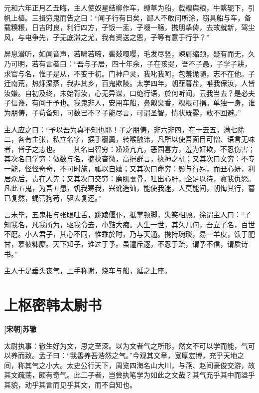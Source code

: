 \documentclass[UTF8,titlepage,oneside]{ctexbook}
\begin{document}
元和六年正月乙丑晦，主人使奴星结柳作车，缚草为船，载糗舆粮，牛繫轭下，引帆上樯。三揖穷鬼而告之曰：“闻子行有日矣，鄙人不敢问所涂，窃具船与车，备载糗粻，日吉时良，利行四方，子饭一盂，子啜一觞，携朋挚俦，去故就新，驾尘风，与电争先，子无底滞之尤，我有资送之恩，子等有意于行乎？”

屏息潜听，如闻音声，若啸若啼，砉敥嘎嘤，毛发尽竖，竦肩缩颈，疑有而无，久乃可明，若有言者曰：“吾与子居，四十年余，子在孩提，吾不子愚，子学子耕，求官与名，惟子是从，不变于初。门神户灵，我叱我呵，包羞诡随，志不在他。子迁南荒，热烁湿蒸，我非其乡，百鬼欺陵。太学四年，朝韮暮盐，唯我保汝，人皆汝嫌。自初及终，未始背汝，心无异谋，口绝行语，於何听闻，云我当去？是必夫子信谗，有间于予也。我鬼非人，安用车船，鼻齅臭香，糗粻可捐。单独一身，谁为朋俦，子苟备知，可数已不？子能尽言，可谓圣智，情状既露，敢不回避。”

主人应之曰：“予以吾为真不知也耶！子之朋俦，非六非四，在十去五，满七除二，各有主张，私立名字，捩手覆羹，转喉触讳，凡所以使吾面目可憎、语言无味者，皆子之志也。——其名曰智穷：矫矫亢亢，恶园喜方，羞为奸欺，不忍伤害；其次名曰学穷：傲数与名，摘抉杳微，高挹群言，执神之机；又其次曰文穷：不专一能，怪怪奇奇，不可时施，祗以自嬉；又其次曰命穷：影与行殊，而丑心妍，利居众后，责在人先；又其次曰交穷：磨肌戛骨，吐出心肝，企足以待，寘我仇怨。凡此五鬼，为吾五患，饥我寒我，兴讹造讪，能使我迷，人莫能间，朝悔其行，暮已复然，蝇营狗苟，驱去复还。”

言未毕，五鬼相与张眼吐舌，跳踉偃仆，抵掌顿脚，失笑相顾。徐谓主人曰：“子知我名，凡我所为，驱我令去，小黠大痴。人生一世，其久几何，吾立子名，百世不磨。小人君子，其心不同，惟乖於时，乃与天通。携持琬琰，易一羊皮，饫于肥甘，慕彼糠糜。天下知子，谁过于予。虽遭斥逐，不忍于疏，谓予不信，请质诗书。”

主人于是垂头丧气，上手称谢，烧车与船，延之上座。 


\chapter*{上枢密韩太尉书}
\begin{center}
	\textbf{[宋朝]苏辙}
\end{center}

太尉执事：辙生好为文，思之至深。以为文者气之所形，然文不可以学而能，气可以养而致。孟子曰：“我善养吾浩然之气。”今观其文章，宽厚宏博，充乎天地之间，称其气之小大。太史公行天下，周览四海名山大川，与燕、赵间豪俊交游，故其文疏荡，颇有奇气。此二子者，岂尝执笔学为如此之文哉？其气充乎其中而溢乎其貌，动乎其言而见乎其文，而不自知也。
\end{document}
